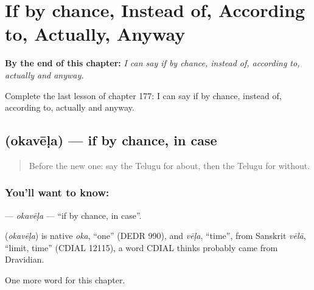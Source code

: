 
\chapter{If by chance, Instead of, According to, Actually, Anyway}
\label{ch:te-if-by-chance-instead-of-according-to-actually-anyway}

\begin{chapteropening}
\textbf{By the end of this chapter:} \emph{I can say if by chance, instead of, according to, actually and anyway.}

Complete the last lesson of chapter 177: I can say if by chance, instead of, according to, actually and anyway.
\end{chapteropening}

\section[\texorpdfstring{\te{ఒకవేళ} (okavēḷa)}{ఒకవేళ (okavēḷa)}]{ (okavēḷa) — if by chance, in case}

\label{lesson:TE-C177-okavela}



\begin{quote}
Before the new one: say the Telugu for about, then the Telugu for without.
\end{quote}

\subsection*{You'll want to know: }
\textbf{} — \emph{okavēḷa} — \textquotedblleft{}if by chance, in case\textquotedblright{}.

\begin{cousinweb}
\textbf{} (\emph{okavēḷa}) is native \emph{oka}, \textquotedblleft{}one\textquotedblright{} (DEDR 990), and \emph{vēḷa}, \textquotedblleft{}time\textquotedblright{}, from Sanskrit \emph{vēlā}, \textquotedblleft{}limit, time\textquotedblright{} (CDIAL 12115), a word CDIAL thinks probably came from Dravidian.
\end{cousinweb}

\begin{grammarlens}[title={What you've built}]
One more word for this chapter.
\end{grammarlens}

